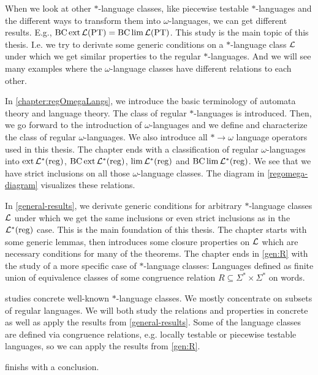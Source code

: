 When we look at other $*$-language classes, like piecewise testable $*$-languages and the different ways to transform them into $\omega$-languages, we can get different results. E.g., $\operatorname{BC} \operatorname{ext} \mathcal{L}(\textup{\textrm{PT}}) = \operatorname{BC} \lim \mathcal{L}(\textup{\textrm{PT}})$. This study is the main topic of this thesis. I.e. we try to derivate some generic conditions on a $*$-language class $\mathcal{L}$ under which we get similar properties to the regular $*$-languages. And we will see many examples where the $\omega$-language classes have different relations to each other.

In \cref{chapter:regOmegaLangs}, we introduce the basic terminology of automata theory and language theory. The class of regular $*$-languages is introduced. Then, we go forward to the introduction of $\omega$-languages and we define and characterize the class of regular $\omega$-languages. We also introduce all $* \rightarrow \omega$ language operators used in this thesis. The chapter ends with a classification of regular $\omega$-languages into $\operatorname{ext} \mathcal{L}^*(\textup{\textrm{reg}})$, $\operatorname{BC} \operatorname{ext} \mathcal{L}^*(\textup{\textrm{reg}})$, $\lim \mathcal{L}^*(\textup{\textrm{reg}})$ and $\operatorname{BC} \lim \mathcal{L}^*(\textup{\textrm{reg}})$. We see that we have strict inclusions on all those $\omega$-language classes. The diagram in \cref{regomega-diagram} visualizes these relations.

In \cref{general-results}, we derivate generic conditions for arbitrary $*$-language classes $\mathcal{L}$ under which we get the same inclusions or even strict inclusions as in the $\mathcal{L}^*(\textup{\textrm{reg}})$ case. This is the main foundation of this thesis. The chapter starts with some generic lemmas, then introduces some closure properties on $\mathcal{L}$ which are necessary conditions for many of the theorems. The chapter ends in \cref{gen:R} with the study of a more specific case of $*$-language classes: Languages defined as finite union of equivalence classes of some congruence relation $R \subseteq \Sigma^*\times\Sigma^*$ on words.

 studies concrete well-known $*$-language classes. We mostly concentrate on subsets of regular languages. We will both study the relations and properties in concrete as well as apply the results from \cref{general-results}. Some of the language classes are defined via congruence relations, e.g. locally testable or piecewise testable languages, so we can apply the results from \cref{gen:R}.

 finishs with a conclusion.
